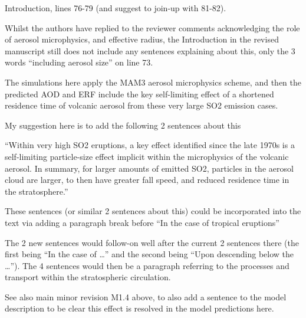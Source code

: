 \documentclass{reviewresponse}
\let\cite\shortcite %
\begin{document}
  \begin{revcomment}[after title={: M3},colframe={colorcommentresolved}]
    Introduction, lines 76-79 (and suggest to join-up with 81-82).

    Whilst the authors have replied to the reviewer comments acknowledging the role of
    aerosol microphysics, and effective radius, the Introduction in the revised
    manuscript still does not include any sentences explaining about this, only the 3
    words ``including aerosol size'' on line 73.

    The simulations here apply the MAM3 aerosol microphysics scheme, and then the
    predicted AOD and ERF include the key self-limiting effect of a shortened residence
    time of volcanic aerosol from these very large SO2 emission cases.

    My suggestion here is to add the following 2 sentences about this

    ``Within very high SO2 eruptions, a key effect identified since the late 1970s
    \cite{rossow1977,rossow1978,turco1979} is a self-limiting particle-size effect
    implicit within the microphysics of the volcanic aerosol. In summary, for larger
    amounts of emitted SO2, particles in the aerosol cloud are larger, to then have
    greater fall speed, and reduced residence time in the stratosphere.''

    These sentences (or similar 2 sentences about this) could be incorporated into the
    text via adding a paragraph break before ``In the case of tropical eruptions''

    The 2 new sentences would follow-on well after the current 2 sentences there (the
    first being ``In the case of \ldots'' and the second being ``Upon descending below
    the \ldots''). The 4 sentences would then be a paragraph referring to the processes
    and transport within the stratospheric circulation.

    See also main minor revision M1.4 above, to also add a sentence to the model
    description to be clear this effect is resolved in the model predictions here.
  \end{revcomment}
\end{document}

